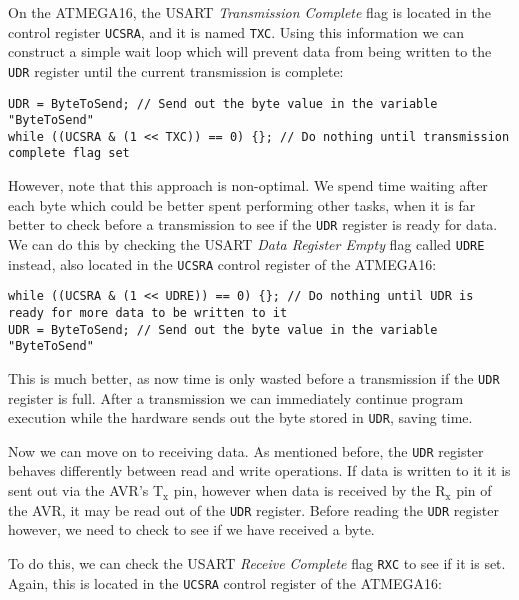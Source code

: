 \documentclass[a4paper,oneside]{book}
\newcommand{\subscript}[1]{\ensuremath{_{\textrm{#1}}}}
\begin{document}
On the ATMEGA16, the USART \emph{Transmission Complete} flag is located in the control register \texttt{UCSRA}, and it is named \texttt{TXC}. Using this information we can construct a simple wait loop which will prevent data from being written to the \texttt{UDR} register until the current transmission is complete:

\begin{center}
\begin{lstlisting}
UDR = ByteToSend; // Send out the byte value in the variable "ByteToSend"
while ((UCSRA & (1 << TXC)) == 0) {}; // Do nothing until transmission complete flag set
\end{lstlisting}
\end{center}

However, note that this approach is non-optimal. We spend time waiting after each byte which could be better spent performing other tasks, when it is far better to check before a transmission to see if the \texttt{UDR} register is ready for data. We can do this by checking the USART \emph{Data Register Empty} flag called \texttt{UDRE} instead, also located in the \texttt{UCSRA} control register of the ATMEGA16:

\begin{center}
\begin{lstlisting}
while ((UCSRA & (1 << UDRE)) == 0) {}; // Do nothing until UDR is ready for more data to be written to it
UDR = ByteToSend; // Send out the byte value in the variable "ByteToSend"
\end{lstlisting}
\end{center}

This is much better, as now time is only wasted before a transmission if the \texttt{UDR} register is full. After a transmission we can immediately continue program execution while the hardware sends out the byte stored in \texttt{UDR}, saving time.


Now we can move on to receiving data. As mentioned before, the \texttt{UDR} register behaves differently between read and write operations. If data is written to it it is sent out via the AVR's T\subscript{x} pin, however when data is received by the R\subscript{x} pin of the AVR, it may be read out of the \texttt{UDR} register. Before reading the \texttt{UDR} register however, we need to check to see if we have received a byte.

To do this, we can check the USART \emph{Receive Complete} flag \texttt{RXC} to see if it is set. Again, this is located in the \texttt{UCSRA} control register of the ATMEGA16:
\end{document}
